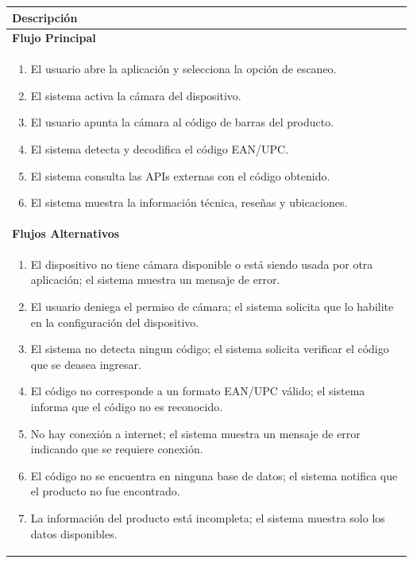 \begin{table}[H]
\centering
\begin{tabular}{p{15.5cm}}
\toprule
\textbf{Descripción} \\
\midrule
\textbf{Flujo Principal} \\[2pt]
\begin{enumerate}[topsep=0pt, partopsep=0pt, leftmargin=30pt]
\item El usuario abre la aplicación y selecciona la opción de escaneo.
\item El sistema activa la cámara del dispositivo.
\item El usuario apunta la cámara al código de barras del producto.
\item El sistema detecta y decodifica el código EAN/UPC\@.
\item El sistema consulta las APIs externas con el código obtenido.
\item El sistema muestra la información técnica, reseñas y ubicaciones.
\end{enumerate} \\
\midrule
\textbf{Flujos Alternativos} \\[2pt]
\begin{enumerate}[topsep=0pt, partopsep=0pt, leftmargin=30pt]
\item[2a.] El dispositivo no tiene cámara disponible o está siendo usada
    por otra aplicación; el sistema muestra un mensaje de error.
\item[2b.] El usuario deniega el permiso de cámara; el sistema solicita
    que lo habilite en la configuración del dispositivo.
\item[4b.] El sistema no detecta ningun código; el sistema solicita 
    verificar el código que se deasea ingresar.
\item[4c.] El código no corresponde a un formato EAN/UPC válido; el
    sistema informa que el código no es reconocido.
\item[5a.] No hay conexión a internet; el sistema muestra un mensaje de
    error indicando que se requiere conexión.
\item[5c.] El código no se encuentra en ninguna base de datos; el sistema
    notifica que el producto no fue encontrado.
\item[6a.] La información del producto está incompleta; el sistema muestra
    solo los datos disponibles.
\end{enumerate} \\
\bottomrule
\end{tabular}
\end{table}